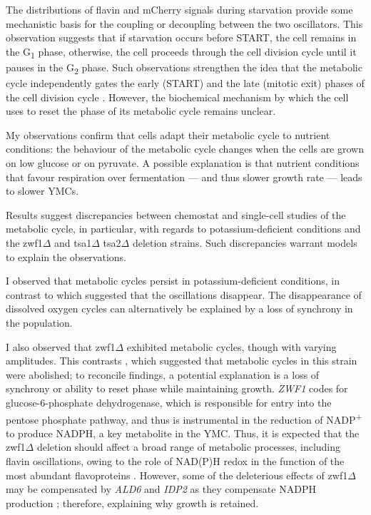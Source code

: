 The distributions of flavin and mCherry signals during starvation provide some mechanistic basis for the coupling or decoupling between the two oscillators.
This observation suggests that if starvation occurs before START, the cell remains in the G\textsubscript{1} phase, otherwise, the cell proceeds through the cell division cycle until it pauses in the G\textsubscript{2} phase.
Such observations strengthen the idea that the metabolic cycle independently gates the early (START) and the late (mitotic exit) phases of the cell division cycle \parencite{ozsezenInferenceHighLevelInteraction2019}.
However, the biochemical mechanism by which the cell uses to reset the phase of its metabolic cycle remains unclear.

My observations confirm that cells adapt their metabolic cycle to nutrient conditions:
the behaviour of the metabolic cycle changes when the cells are grown on low glucose or on pyruvate.
A possible explanation is that nutrient conditions that favour respiration over fermentation --- and thus slower growth rate --- leads to slower YMCs.

Results suggest discrepancies between chemostat and single-cell studies of the metabolic cycle, in particular, with regards to potassium-deficient conditions and the zwf1$\Delta$ and tsa1$\Delta$ tsa2$\Delta$ deletion strains.
Such discrepancies warrant models to explain the observations.

I observed that metabolic cycles persist in potassium-deficient conditions, in contrast to \textcite{oneillEukaryoticCellBiology2020} which suggested that the oscillations disappear.
The disappearance of dissolved oxygen cycles can alternatively be explained by a loss of synchrony in the population.

I also observed that zwf1$\Delta$ exhibited metabolic cycles, though with varying amplitudes.
This contrasts \textcite{tuCyclicChangesMetabolic2007}, which suggested that metabolic cycles in this strain were abolished; to reconcile findings, a potential explanation is a loss of synchrony or ability to reset phase while maintaining growth.
\textit{ZWF1} codes for glucose-6-phosphate dehydrogenase, which is responsible for entry into the pentose phosphate pathway, and thus is instrumental in the reduction of NADP\textsuperscript{+} to produce NADPH, a key metabolite in the YMC.
Thus, it is expected that the zwf1$\Delta$ deletion should affect a broad range of metabolic processes, including flavin oscillations, owing to the role of NAD(P)H redox in the function of the most abundant flavoproteins \parencite{gudipatiFlavoproteomeYeastSaccharomyces2014}.
However, some of the deleterious effects of zwf1$\Delta$ may be compensated by \textit{ALD6} and \textit{IDP2} as they compensate NADPH production \parencite{minardSourcesNADPHYeast2005}; therefore, explaining why growth is retained.

